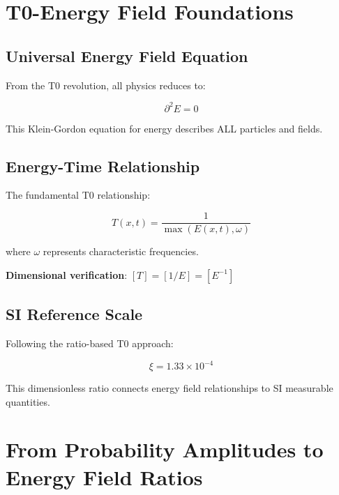 \documentclass[12pt,a4paper]{article}
\newcommand{\Tfield}{T}
\newcommand{\Efield}{E}
\newcommand{\xipar}{\xi}
\begin{document}
	\section{T0-Energy Field Foundations}
	
	\subsection{Universal Energy Field Equation}
	
	From the T0 revolution, all physics reduces to:
	
	\begin{equation}
		\boxed{\partial^2 \Efield = 0}
		\label{eq:universal_field_equation}
	\end{equation}
	
	This Klein-Gordon equation for energy describes ALL particles and fields.
	
	\subsection{Energy-Time Relationship}
	
	The fundamental T0 relationship:
	
	\begin{equation}
		\boxed{\Tfield(x,t) = \frac{1}{\max(\Efield(x,t), \omega)}}
		\label{eq:energy_time_relation}
	\end{equation}
	
	where $\omega$ represents characteristic frequencies.
	
	\textbf{Dimensional verification}: $[\Tfield] = [1/E] = [E^{-1}]$ \checkmark
	
	\subsection{SI Reference Scale}
	
	Following the ratio-based T0 approach:
	
	\begin{equation}
		\boxed{\xipar = 1.33 \times 10^{-4}}
		\label{eq:si_reference_scale}
	\end{equation}
	
	This dimensionless ratio connects energy field relationships to SI measurable quantities.
	
	\section{From Probability Amplitudes to Energy Field Ratios}
	
\end{document}
